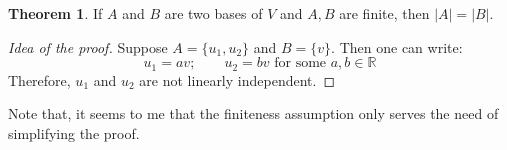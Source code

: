 \documentclass[12pt]{article}
\newcommand{\R}{{\mathbb R}}
\theoremstyle{definition}
\newtheorem{theorem}{Theorem}[section]
\theoremstyle{plain}
\begin{document}
\begin{theorem}
    If $A$ and $B$ are two bases of $V$ and $A, B$ are finite, then $|A| = |B|$.
    \begin{proof}[Idea of the proof]
        Suppose $A = \{ u_1, u_2 \}$ and $B = \{v\}$. Then one can write: 
        \[
            u_1 = a v; \qquad u_2 = bv \text{ for some } a, b\in \R
        \]
        Therefore, $u_1$ and $u_2$ are not linearly independent.
        
    \end{proof}

    Note that, it seems to me that the finiteness assumption only serves the 
    need of simplifying the proof.
\end{theorem}




\end{document}
